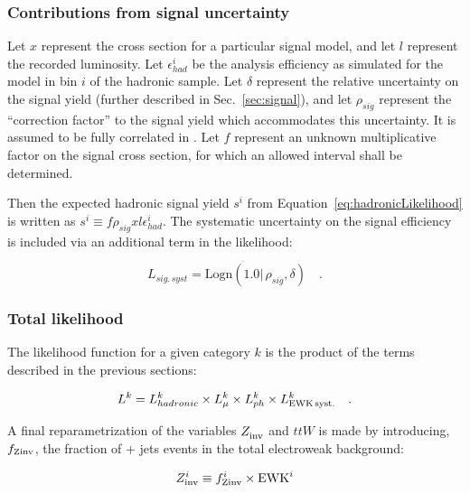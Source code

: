 \subsubsection{Contributions from signal uncertainty}
\label{sec:signalContrib}

Let $x$ represent the cross section for a particular signal model, and
let $l$ represent the recorded luminosity.  Let $\epsilon^{i}_{had}$ 
be the analysis efficiency as simulated for the model in \HT bin $i$ 
of the hadronic sample.  Let $\delta$ represent the relative uncertainty on
the signal yield (further described in Sec.~\ref{sec:signal}), and let $\rho_{sig}$ 
represent the ``correction factor'' to the signal yield which accommodates 
this uncertainty. It is assumed to be fully correlated in \scalht. 
Let $f$ represent an unknown multiplicative factor on 
the signal cross section, for which an allowed interval shall be determined.

Then the expected hadronic signal yield $s^i$ from
Equation~\ref{eq:hadronicLikelihood} is written as $s^i \equiv
f\rho_{sig} xl\epsilon_{had}^i$. The systematic uncertainty on
the signal efficiency is included via an additional term in the
likelihood:

\begin{equation}
L_{sig.\,syst}=\mathrm{Logn}(1.0 |\,\rho_{sig}, \delta) \quad .
\end{equation}

\subsubsection{Total likelihood}
\label{sec:totalLikelihood}

The likelihood function for a given category $k$ is the product of
the terms described in the previous sections:

\begin{equation}
L^k = L_{hadronic}^k \times L_{\mu}^k \times L_{ph}^k \times
L_{\rm EWK\, syst.}^k \quad .
\end{equation}

A final reparametrization of the variables $Z_{\rm inv}^{}$ and $ttW$ is made
by introducing, $f_{\rm Zinv}$, the fraction of \znunu + jets events in the total
electroweak background:

\begin{equation}
  Z_{\rm inv}^{i} \equiv f_{\rm Zinv}^{i} \times \mathrm{EWK}^i 
  \label{eq:ZinvEwk}
\end{equation}

